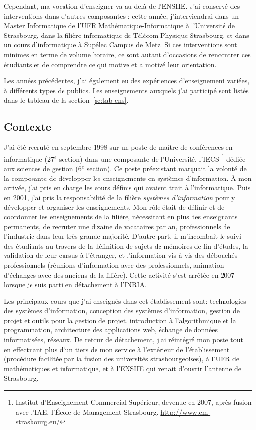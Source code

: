 \documentclass[11pt]{article}
\begin{document}
Cependant, ma  vocation d'enseigner  va au-delà de  l'ENSIIE. J'ai  conservé des
interventions dans d'autres  composantes : cette année,  j'interviendrai dans un
Master  Informatique  de  l'UFR   Mathématique-Informatique  à  l'Université  de
Strasbourg, dans la filière informatique de Télécom Physique Strasbourg, et dans
un cours  d'informatique à  Supélec Campus  de Metz.  Si ces  interventions sont
minimes en terme de volume horaire, ce sont autant d'occasions de rencontrer ces
étudiants et de comprendre ce qui motive et a motivé leur orientation.


Les années précédentes, j'ai également eu des expériences d'enseignement variées,
à différents types de publics. Les enseignements auxquels j'ai participé sont listés
dans le tableau de la section~\ref{sc:tab-ens}.


\subsection{Contexte}

\noindent
J'ai été recruté en septembre 1998 sur un poste de maître de conférences 
en informatique (27$^e$ section) dans une composante de l'Université, l'IECS%
\footnote{Institut d'Enseignement  Commercial Supérieur, devenue en  2007, après
  fusion        avec        l'IAE,         l'\'Ecole        de        Management
  Strasbourg. \url{http://www.em-strasbourg.eu/}} dédiée aux sciences de gestion
(6$^e$ section).  Ce  poste préexistant marquait la volonté de  la composante de
développer les  enseignements en systèmes  d'information. \`A mon  arrivée, j'ai
pris en  charge les cours définis  qui avaient trait à  l'informatique.  Puis en
2001, j'ai pris la responsabilité  de la filière \textit{systèmes d'information}
pour y développer et organiser les  enseignements.  Mon rôle était de définir et
de  coordonner  les  enseignements  de  la  filière,  nécessitant  en  plus  des
enseignants  permanents,  de   recruter  une  dizaine  de   vacataires  par  an,
professionnels de l'industrie  dans leur très grande majorité.  D'autre part, il
m'incombait le  suivi des  étudiants au  travers de la  définition de  sujets de
mémoires  de  fin d'études,  la  validation  de  leur  cursus à  l'étranger,  et
l'information  vis-à-vis des  débouchés  professionnels (réunions  d'information
avec des professionnels,  animation d'échanges avec des anciens  de la filière).
Cette activité  s'est arrêtée  en 2007  lorsque je suis  parti en  détachement à
l'INRIA.


Les  principaux   cours  que  j'ai   enseignés  dans  cet   établissement  sont:
technologies des systèmes d'information,  conception des systèmes d'information,
gestion  de  projet  et  outils  pour  la  gestion  de  projet,  introduction  à
l'algorithmique et la programmation,  architecture des applications web, échange
de données informatisées, réseaux.  De retour de détachement, j'ai réintégré mon
poste  tout en  effectuant  plus d'un  tiers  de mon  service  à l'extérieur  de
l'établissement   (procédure   facilitée   par   la   fusion   des   universités
strasbourgeoises), à l'UFR  de mathématiques et informatique, et  à l'ENSIIE qui
venait d'ouvrir l'antenne de Strasbourg.
\end{document}
